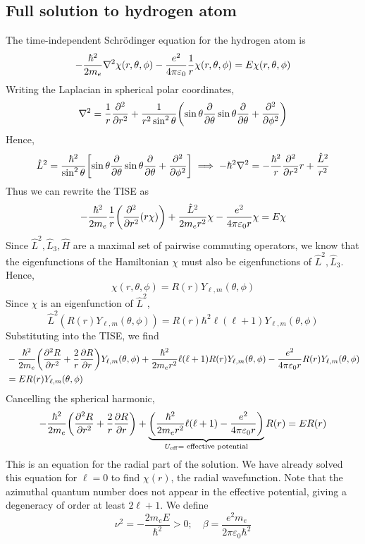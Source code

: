 \subsection{Full solution to hydrogen atom}
The time-independent Schr\"odinger equation for the hydrogen atom is
\[
	-\frac{\hbar^2}{2m_e} \laplacian{\chi(r, \theta, \phi)} - \frac{e^2}{4 \pi \varepsilon_0} \frac{1}{r} \chi(r, \theta, \phi) = E \chi(r,\theta, \phi)
\]
Writing the Laplacian in spherical polar coordinates,
\[
	\laplacian{} = \frac{1}{r} \pdv[2]{r} + \frac{1}{r^2 \sin^2 \theta} \qty( \sin \theta \pdv{\theta} \sin \theta \pdv{\theta} + \pdv[2]{\phi} )
\]
Hence,
\[
	\hat L^2 = \frac{\hbar^2}{\sin^2\theta} \qty[ \sin \theta \pdv{\theta} \sin \theta \pdv{\theta} + \pdv[2]{\phi} ] \implies -\hbar^2 \laplacian{} = -\frac{\hbar^2}{r} \pdv[2]{r} r + \frac{\hat L^2}{r^2}
\]
Thus we can rewrite the TISE as
\[
	-\frac{\hbar^2}{2m_e} \frac{1}{r} \qty( \pdv[2]{r} \qty(r \chi) ) + \frac{\hat L^2}{2 m_e r^2} \chi - \frac{e^2}{4 \pi \varepsilon_0 r} \chi = E \chi
\]
Since \( \hat L^2, \hat L_3, \hat H \) are a maximal set of pairwise commuting operators, we know that the eigenfunctions of the Hamiltonian \( \chi \) must also be eigenfunctions of \( \hat L^2, \hat L_3 \).
Hence,
\[
	\chi(r,\theta,\phi) = R(r) Y_{\ell, m}(\theta, \phi)
\]
Since \( \chi \) is an eigenfunction of \( \hat L^2 \),
\[
	\hat L^2 (R(r) Y_{\ell,m}(\theta,\phi)) = R(r) \hbar^2 \ell (\ell+1)Y_{\ell,m}(\theta, \phi)
\]
Substituting into the TISE, we find
\begin{align*}
	& -\frac{\hbar^2}{2m_e} \qty( \pdv[2]{R}{r} + \frac{2}{r} \pdv{R}{r} ) Y_{\ell,m}(\theta, \phi) + \frac{\hbar^2}{2 m_e r^2} \ell(\ell+1) R(r)Y_{\ell,m}(\theta, \phi) - \frac{e^2}{4 \pi \varepsilon_0 r} R(r)Y_{\ell,m}(\theta,\phi) \\
	& = E R(r)Y_{\ell,m}(\theta,\phi)
\end{align*}
Cancelling the spherical harmonic,
\[
	-\frac{\hbar^2}{2m_e} \qty( \pdv[2]{R}{r} + \frac{2}{r} \pdv{R}{r} ) + \underbrace{\qty(\frac{\hbar^2}{2 m_e r^2} \ell(\ell+1) - \frac{e^2}{4 \pi \varepsilon_0 r})}_{U_{\mathrm{eff}} = \text{ effective potential}} R(r) = E R(r)
\]
This is an equation for the radial part of the solution.
We have already solved this equation for \( \ell = 0 \) to find \( \chi(r) \), the radial wavefunction.
Note that the azimuthal quantum number does not appear in the effective potential, giving a degeneracy of order at least \( 2 \ell + 1 \).
We define
\[
	\nu^2 = -\frac{2m_e E}{\hbar^2} > 0;\quad \beta = \frac{e^2 m_e}{2 \pi \varepsilon_0 \hbar^2}
\]
